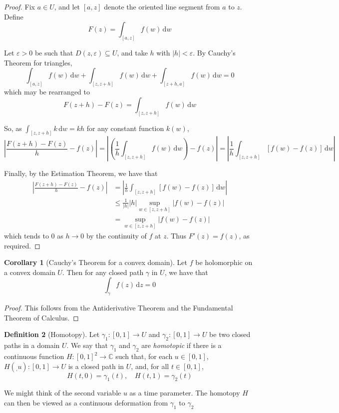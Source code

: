 \documentclass[10pt,fleqn]{article}
\newcommand{\diff}{\,\mathrm{d}}
\newcommand{\comps}{\mathbb{C}}
\newcommand{\eps}{\varepsilon}
\theoremstyle{definition} \newtheorem{defn}{Definition}[section]
\theoremstyle{plain}      \newtheorem{thm}[defn]{Theorem}
\theoremstyle{definition} \newtheorem{prop}[defn]{Proposition}
\theoremstyle{plain}      \newtheorem{lem}[defn]{Lemma}
\theoremstyle{definition} \newtheorem{cor}[defn]{Corollary}
\theoremstyle{definition} \newtheorem{ex}[defn]{Example}
\theoremstyle{definition} \newtheorem{rem}[defn]{Remark}
\begin{document}
\begin{proof}
    Fix $a\in U$, and let $[a,z]$ denote the oriented line segment from $a$ to $z$.
    Define
    \[
        F(z)=
        \int_{[a,z]} f(w)\diff w
    \]

    Let $\eps>0$ be such that $D(z,\eps)\subseteq U$, and take $h$ with $|h|<\eps$.
    By Cauchy's Theorem for triangles,
    \[
        \int_{[a,z]} f(w)\diff w+\int_{[z,z+h]} f(w)\diff w+\int_{[z+h,a]} f(w)\diff w=
        0
    \]
    which may be rearranged to
    \[
        F(z+h)-F(z)=
        \int_{[z,z+h]} f(w)\diff w
    \]

    So, as $\int_{[z,z+h]}k\diff w=kh$ for any constant function $k(w)$,
    \[
        \left|\frac{F(z+h)-F(z)}{h}-f(z)\right|=
        \left|\left(\frac{1}{h}\int_{[z,z+h]}f(w)\diff w\right)-f(z)\right|=
        \left|\frac{1}{h}\int_{[z,z+h]}[f(w)-f(z)]\diff w\right|
    \]

    Finally, by the Estimation Theorem, we have that
    \begin{align*}
        \left|\frac{F(z+h)-F(z)}{h}-f(z)\right|
        &=
        \left|\frac{1}{h}\int_{[z,z+h]}[f(w)-f(z)]\diff w\right|\\
        &\leq
        \frac{1}{|h|}|h|\sup_{w\in[z,z+h]}|f(w)-f(z)|\\
        &=
        \sup_{w\in[z,z+h]}|f(w)-f(z)|
    \end{align*}
    which tends to $0$ as $h\to0$ by the continuity of $f$ at $z$.
    Thus $F'(z)=f(z)$, as required.
\end{proof}

\begin{cor}[Cauchy's Theorem for a convex domain]
    Let $f$ be holomorphic on a convex domain $U$.
    Then for any closed path $\gamma$ in $U$, we have that
    \begin{equation}
        \int_{\gamma} f(z)\diff z=0
    \end{equation}
\end{cor}

\begin{proof}
    This follows from the Antiderivative Theorem and the Fundamental Theorem of Calculus.
\end{proof}

\begin{defn}[Homotopy]
    Let $\gamma_1:[0,1]\to U$ and $\gamma_2:[0,1]\to U$ be two closed paths in a domain $U$.
    We say that $\gamma_1$ and $\gamma_2$ are \emph{homotopic} if there is a continuous function $H:[0,1]^2\to\comps$ such that, for each $u\in[0,1]$, $H(_,u):[0,1]\to U$ is a closed path in $U$, and, for all $t\in[0,1]$,
    \[
        H(t,0)=\gamma_1(t),\quad
        H(t,1)=\gamma_2(t)
    \]

    We might think of the second variable $u$ as a time parameter.
    The homotopy $H$ can then be viewed as a continuous deformation from $\gamma_1$ to $\gamma_2$
\end{defn}
\end{document}
